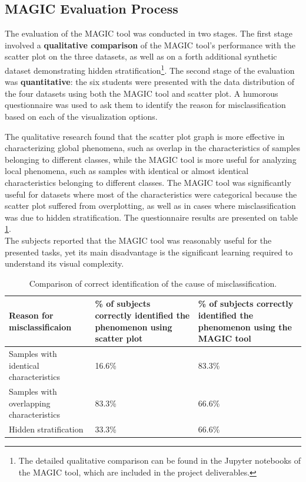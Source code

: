 \documentclass[11pt]{article}
\begin{document}
\subsection{MAGIC Evaluation Process}\label{MAGIC Evaluation Process}
The evaluation of the MAGIC tool was conducted in two stages. The first stage involved a \textbf{qualitative comparison} of the MAGIC tool's performance with the scatter plot on the three datasets, as well as on a forth additional synthetic dataset demonstrating hidden stratification\footnote{The detailed qualitative comparison can be found in the Jupyter notebooks of the MAGIC tool, which are included in the project deliverables.}. The second stage of the evaluation was \textbf{quantitative}: the six students were presented with the data distribution of the four datasets using both the MAGIC tool and scatter plot. A humorous questionnaire was used to ask them to identify the reason for misclassification based on each of the visualization options.

The qualitative research found that the scatter plot graph is more effective in characterizing global phenomena, such as overlap in the characteristics of samples belonging to different classes, while the MAGIC tool is more useful for analyzing local phenomena, such as samples with identical or almost identical characteristics belonging to different classes. The MAGIC tool was significantly useful for datasets where most of the characteristics were categorical because the scatter plot suffered from overplotting, as well as in cases where misclassification was due to hidden stratification. The questionnaire results are presented on table \ref{table:tab2}.\\
The subjects reported that the MAGIC tool was reasonably useful for the presented tasks, yet its main disadvantage is the significant learning required to understand its visual complexity.
\begin{table}[h]
\centering
\begin{tabular}{ |m{3.7cm}||m{5.9cm}|m{6.5cm}| } 
\hline
Reason for misclassificaion & \% of subjects correctly identified the phenomenon using scatter plot & \% of subjects correctly identified the phenomenon using the MAGIC tool \\
\hline
\hline
Samples with identical characteristics & 16.6\% & 83.3\% \\
\hline
Samples with overlapping characteristics & 83.3\% & 66.6\% \\
\hline
Hidden stratification & 33.3\% & 66.6\% \\
\hline
\end{tabular}
\caption{Comparison of correct identification of the cause of misclassification.}
\label{table:tab2}
\end{table}
\end{document}
